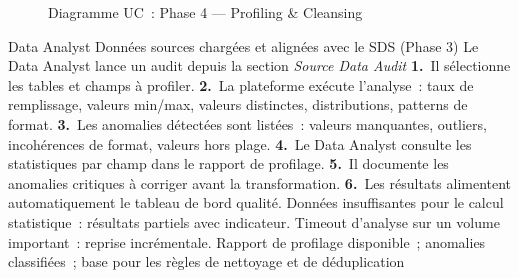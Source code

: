 \begin{figure}[H]
\centering
{}
\caption{Diagramme UC~: Phase 4 — Profiling \& Cleansing}
\label{fig:uc-phase4}
\end{figure}

  {Data Analyst}
  {Données sources chargées et alignées avec le SDS (Phase 3)}
  {Le Data Analyst lance un audit depuis la section \textit{Source Data Audit}}
  {\textbf{1.}~Il sélectionne les tables et champs à profiler.\newline
   \textbf{2.}~La plateforme exécute l'analyse~: taux de remplissage, valeurs min/max, valeurs distinctes, distributions, patterns de format.\newline
   \textbf{3.}~Les anomalies détectées sont listées~: valeurs manquantes, outliers, incohérences de format, valeurs hors plage.\newline
   \textbf{4.}~Le Data Analyst consulte les statistiques par champ dans le rapport de profilage.\newline
   \textbf{5.}~Il documente les anomalies critiques à corriger avant la transformation.\newline
   \textbf{6.}~Les résultats alimentent automatiquement le tableau de bord qualité.}
  {Données insuffisantes pour le calcul statistique~: résultats partiels avec indicateur. Timeout d'analyse sur un volume important~: reprise incrémentale.}
  {Rapport de profilage disponible~; anomalies classifiées~; base pour les règles de nettoyage et de déduplication}

